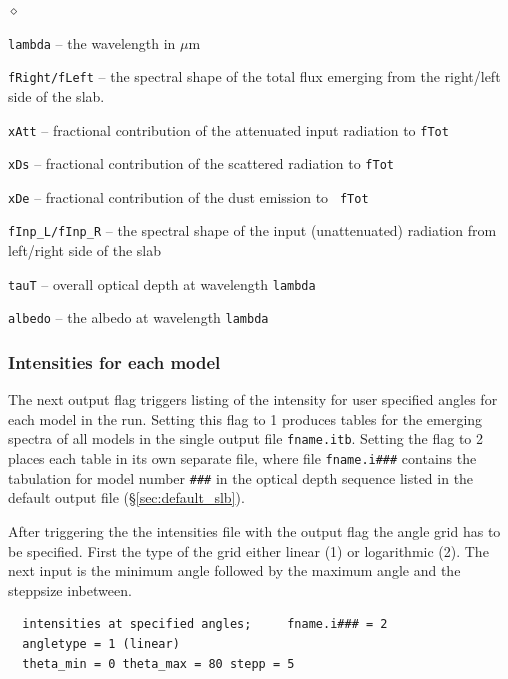\documentclass[11pt]{article}
\def\E#1{\hbox{$10^{#1}$}}
\def\mic    {\hbox{$\mu$m}}
\begin{document}
\begin{list}{$\diamond$}{}
\item {\tt lambda} -- the wavelength in \mic
\item {\tt fRight/fLeft} -- the spectral shape of the total flux
  emerging from the right/left side of the slab.
%
\item{\tt xAtt} -- fractional contribution of the attenuated input
  radiation to {\tt fTot}
\item{\tt xDs} -- fractional contribution of the scattered radiation
  to {\tt fTot}
\item{\tt xDe} -- fractional contribution of the dust emission to {\tt
    fTot}
\item{\tt fInp\_L/fInp\_R} -- the spectral shape of the input
  (unattenuated) radiation from left/right side of the slab
\item{\tt tauT} -- overall optical depth at wavelength {\tt lambda}
\item{\tt albedo} -- the albedo at wavelength {\tt lambda}
\end{list}

\subsubsection{Intensities for each model }
\label{sec:inten_slb}

The next output flag triggers listing of the intensity for user
specified angles for each model in the run.  Setting this flag to 1
produces tables for the emerging spectra of all models in the single
output file {\tt fname.itb}.  Setting the flag to 2 places each table
in its own separate file, where file {\tt fname.i\#\#\#} contains the
tabulation for model number {\tt \#\#\#} in the optical depth sequence
listed in the default output file (\S\ref{sec:default_slb}).

After triggering the the intensities file with the output flag the
angle grid has to be specified. First the type of the grid either
linear (1) or logarithmic (2). The next input is the minimum angle
followed by the maximum angle and the steppsize inbetween.

\begin{verbatim}
  intensities at specified angles;     fname.i### = 2
  angletype = 1 (linear)
  theta_min = 0 theta_max = 80 stepp = 5
\end{verbatim}
\end{document}
